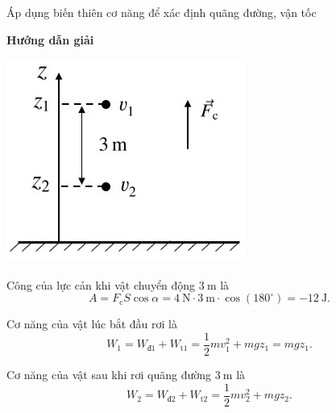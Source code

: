 \begin{dang}{Áp dụng biến thiên cơ năng để xác định quãng đường, vận tốc}
	{	\begin{center}
			\textbf{Hướng dẫn giải}
		\end{center}
		\begin{center}
			\includegraphics[scale=0.6]{../figs/VN10-PH-33-L-025-3-H1.jpg}
		\end{center}
		Công của lực cản khi vật chuyển động $\SI{3}{\meter}$ là
		\begin{equation*}
			A=F_\text{c}S\cos\alpha=\SI{4}{\newton}\cdot\SI{3}{\meter}\cdot\cos(180^\circ)=\SI{-12}{\joule}.
		\end{equation*}
		
		Cơ năng của vật lúc bắt đầu rơi là
		\begin{equation*}
			W_1=W_\text{đ1}+W_\text{t1}=\dfrac{1}{2}mv_1^2+mgz_1=mgz_1.
		\end{equation*}
		
		Cơ năng của vật sau khi rơi quãng đường $\SI{3}{\meter}$ là
		\begin{equation*}
			W_2=W_\text{đ2}+W_\text{t2}=\dfrac{1}{2}mv_2^2+mgz_2.
		\end{equation*}
		
}
\end{dang}
